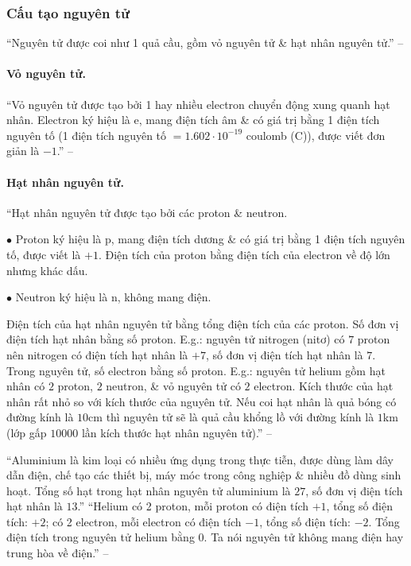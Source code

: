 \documentclass{article}
\numberwithin{equation}{section}
\begin{document}
\subsubsection{Cấu tạo nguyên tử}
``Nguyên tử được coi như 1 quả cầu, gồm vỏ nguyên tử \& hạt nhân nguyên tử.'' -- \cite[p. 11]{SGK_KHTN_7_Canh_Dieu}

\paragraph{Vỏ nguyên tử.} ``Vỏ nguyên tử được tạo bởi 1 hay nhiều electron chuyển động xung quanh hạt nhân. Electron ký hiệu là e, mang điện tích âm \& có giá trị bằng 1 điện tích nguyên tố (1 điện tích nguyên tố $= 1.602\cdot 10^{-19}$ coulomb (C)), được viết đơn giản là $-1$.'' -- \cite[p. 11]{SGK_KHTN_7_Canh_Dieu}

\paragraph{Hạt nhân nguyên tử.} ``Hạt nhân nguyên tử được tạo bởi các proton \& neutron.
\begin{enumerate*}
	\item[$\bullet$] Proton ký hiệu là p, mang điện tích dương \& có giá trị bằng 1 điện tích nguyên tố, được viết là $+1$. Điện tích của proton bằng điện tích của electron về độ lớn nhưng khác dấu.
	\item[$\bullet$] Neutron ký hiệu là n, không mang điện.
\end{enumerate*}
Điện tích của hạt nhân nguyên tử bằng tổng điện tích của các proton. Số đơn vị điện tích hạt nhân bằng số proton. E.g.: nguyên tử nitrogen (nitơ) có $7$ proton nên nitrogen có điện tích hạt nhân là $+7$, số đơn vị điện tích hạt nhân là $7$. Trong nguyên tử, số electron bằng số proton. E.g.: nguyên tử helium gồm hạt nhân có $2$ proton, $2$ neutron, \& vỏ nguyên tử có $2$ electron. Kích thước của hạt nhân rất nhỏ so với kích thước của nguyên tử. Nếu coi hạt nhân là quả bóng có đường kính là $10$cm thì nguyên tử sẽ là quả cầu khổng lồ với đường kính là $1$km (lớp gấp $10000$ lần kích thước hạt nhân nguyên tử).'' -- \cite[p. 11]{SGK_KHTN_7_Canh_Dieu}

``Aluminium là kim loại có nhiều ứng dụng trong thực tiễn, được dùng làm dây dẫn điện, chế tạo các thiết bị, máy móc trong công nghiệp \& nhiều đồ dùng sinh hoạt. Tổng số hạt trong hạt nhân nguyên tử aluminium là $27$, số đơn vị điện tích hạt nhân là $13$.'' ``Helium có 2 proton, mỗi proton có điện tích $+1$, tổng số điện tích: $+2$; có 2 electron, mỗi electron có điện tích $-1$, tổng số điện tích: $-2$. Tổng điện tích trong nguyên tử helium bằng $0$. Ta nói nguyên tử không mang điện hay trung hòa về điện.'' -- \cite[p. 12]{SGK_KHTN_7_Canh_Dieu}
\end{document}
